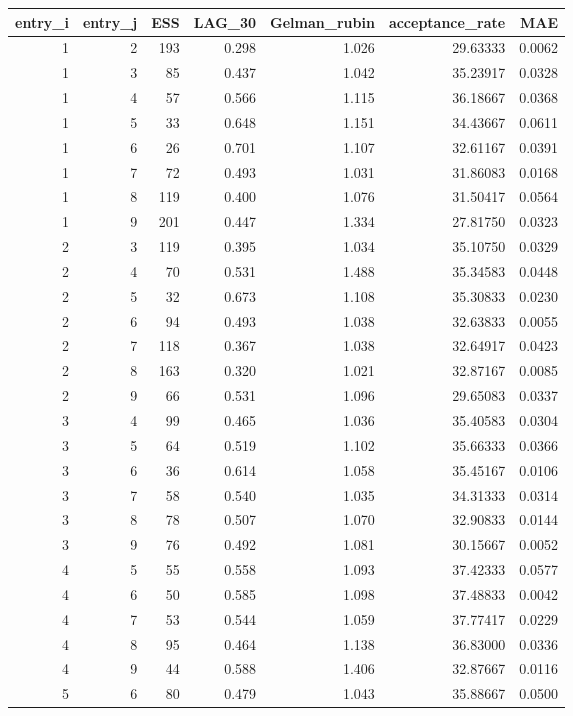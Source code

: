 \begin{longtable}{rrrrrrr}
\toprule
entry\_i & entry\_j & ESS & LAG\_30 & Gelman\_rubin & acceptance\_rate & MAE \\ 
\midrule
1 & 2 & 193 & 0.298 & 1.026 & 29.63333 & 0.0062 \\ 
1 & 3 & 85 & 0.437 & 1.042 & 35.23917 & 0.0328 \\ 
1 & 4 & 57 & 0.566 & 1.115 & 36.18667 & 0.0368 \\ 
1 & 5 & 33 & 0.648 & 1.151 & 34.43667 & 0.0611 \\ 
1 & 6 & 26 & 0.701 & 1.107 & 32.61167 & 0.0391 \\ 
1 & 7 & 72 & 0.493 & 1.031 & 31.86083 & 0.0168 \\ 
1 & 8 & 119 & 0.400 & 1.076 & 31.50417 & 0.0564 \\ 
1 & 9 & 201 & 0.447 & 1.334 & 27.81750 & 0.0323 \\ 
2 & 3 & 119 & 0.395 & 1.034 & 35.10750 & 0.0329 \\ 
2 & 4 & 70 & 0.531 & 1.488 & 35.34583 & 0.0448 \\ 
2 & 5 & 32 & 0.673 & 1.108 & 35.30833 & 0.0230 \\ 
2 & 6 & 94 & 0.493 & 1.038 & 32.63833 & 0.0055 \\ 
2 & 7 & 118 & 0.367 & 1.038 & 32.64917 & 0.0423 \\ 
2 & 8 & 163 & 0.320 & 1.021 & 32.87167 & 0.0085 \\ 
2 & 9 & 66 & 0.531 & 1.096 & 29.65083 & 0.0337 \\ 
3 & 4 & 99 & 0.465 & 1.036 & 35.40583 & 0.0304 \\ 
3 & 5 & 64 & 0.519 & 1.102 & 35.66333 & 0.0366 \\ 
3 & 6 & 36 & 0.614 & 1.058 & 35.45167 & 0.0106 \\ 
3 & 7 & 58 & 0.540 & 1.035 & 34.31333 & 0.0314 \\ 
3 & 8 & 78 & 0.507 & 1.070 & 32.90833 & 0.0144 \\ 
3 & 9 & 76 & 0.492 & 1.081 & 30.15667 & 0.0052 \\ 
4 & 5 & 55 & 0.558 & 1.093 & 37.42333 & 0.0577 \\ 
4 & 6 & 50 & 0.585 & 1.098 & 37.48833 & 0.0042 \\ 
4 & 7 & 53 & 0.544 & 1.059 & 37.77417 & 0.0229 \\ 
4 & 8 & 95 & 0.464 & 1.138 & 36.83000 & 0.0336 \\ 
4 & 9 & 44 & 0.588 & 1.406 & 32.87667 & 0.0116 \\ 
5 & 6 & 80 & 0.479 & 1.043 & 35.88667 & 0.0500 \\ 

\end{longtable}
